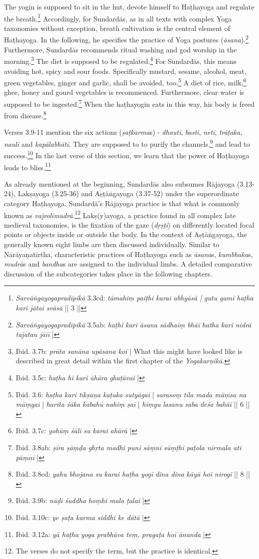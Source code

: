 The yogin is supposed to sit in the hut, devote himself to Haṭhayoga and regulate the breath.\footnote{\textit{Sarvāṅgayogapradīpikā} 3.3cd: \textit{tāmahiṃ paiṭhi karai abhyāsā | gutu gami haṭha kari jātai svāsā} || 3 ||} Accordingly, for Sundardās, as in all texts with complex Yoga taxonomies without exception, breath cultivation is the central element of Haṭhayoga. In the following, he specifies the practice of Yoga postures (\textit{āsana}).\footnote{\textit{Sarvāṅgayogapradīpikā} 3.5ab: \textit{haṭhi kari āsana sādhaiṃ bhāī} \textit{hatha kari nidrā tajatau jāīī} |} Furthermore, Sundardās recommends ritual washing and god worship in the morning.\footnote{Ibid. 3.7b: \textit{prāta sanāna upāsana koī} | What this might have looked like is described in great detail within the first chapter of the \textit{Yogakarṇikā}.} The diet is supposed to be regulated.\footnote{Ibid. 3.5c: \textit{haṭha hī kari āhāra ghaṭāvai} |} For Sundardās, this means avoiding hot, spicy and sour foods. Specifically mustard, sesame, alcohol, meat, green vegetables, ginger and garlic, shall be avoided, too.\footnote{Ibid. 3.6: \textit{haṭha kari tīkṣaṇa kaṭuka sutyāgai} | \textit{sarasoṃ tila mada māṃsa na māṃgai} | \textit{harita śāka kabahū nahiṃ ṣaī} | \textit{hiṃgu lasanu saba deśa bahāī} || 6 ||} A diet of rice, milk,\footnote{Ibid. 3.7c: \textit{gohūṃ śāli su karai ahārā} |} ghee, honey and gourd vegetables is recommenced. Furthermore, clear water is supposed to be ingested.\footnote{Ibid. 3.8ab: \textit{ṣīra ṣāṃḍa ghṛta madhi puni sāṃnī} \textit{sūṃṭhi paṭola nirmala ati pāṃnī} |} When the haṭhayogin eats in this way, his body is freed from disease.\footnote{Ibid. 3.8cd: \textit{yahu bhojana su karai haṭha yogī} \textit{dina dina kāyā hoī nirogī} || 8 ||}

Verses 3.9-11 mention the six actions (\textit{ṣaṭkarma}s) - \textit{dhauti}, \textit{basti}, \textit{netī}, \textit{trāṭaka}, \textit{naulī} and \textit{kapālabhātī}. They are supposed to to purify the channels,\footnote{Ibid. 3.9b: \textit{nāḍī śuddha hoṃhi mala ṭalai} |} and lead to success.\footnote{Ibid. 3.10c: \textit{ye ṣaṭa karma siddhi ke dātā} |} In the last verse of this section, we learn that the power of Haṭhayoga leads to bliss.\footnote{Ibid. 3.12a: \textit{yā haṭha yoga prabhāva teṃ, pragaṭa hoī ānanda} |}

As already mentioned at the beginning, Sundardās also subsumes Rājayoga (3.13-24), Lakṣayoga (3.25-36) and Aṣṭāṅgayoga (3.37-52) under the superordinate category Haṭhayoga. Sundardā's Rājayoga practice is that what is commonly known as \textit{vajrolīmudrā}.\footnote{The verses do not specify the term, but the practice is identical.} Lakṣ(y)ayoga, a practice found in all complex late medieval taxonomies, is the fixation of the gaze (\textit{dṛṣṭi}) on differently located focal points or objects inside or outside the body. In the context of Aṣṭāṅgayoga, the generally known eight limbs are then discussed individually. Similar to Nārāyaṇatīrtha, characteristic practices of Haṭhayoga such as \textit{āsana}s, \textit{kumbhaka}s, \textit{mudrā}s and \textit{bandha}s are assigned to the individual limbs. A detailed comparative discussion of the subcategories takes place in the following chapters.

